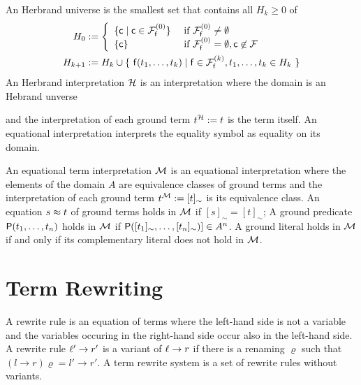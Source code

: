 \begin{definition}\label{def:hk}
	An {\myem Herbrand universe} is the smallest set that contains all $H_k\ge 0$ of
	\begin{align*}
	H_0 &:= \left\{ 
	\begin{array}{ll}
	\{ \mc \mid \mc\in\mcFfn[0] \} 
	&\text{if } \mcFfn[0]\not=\emptyset\\
	\{ \mc \}
	&\text{if } \mcFfn[0]=\emptyset, \mc\not\in\mcF
	\end{array}
	\right. 
	\\
	H_{k+1} &:= H_k \cup \{\  
	\mf(t_1,\ldots,t_k) \mid
	\mf\in\mcFfn[k],
	t_1,\ldots,t_k \in H_k
	\ \}
	\end{align*}
	An {\myem Herbrand interpretation} ${\mathcal H}$ is an interpretation where the domain 
	is an Hebrand unverse
\end{definition}

\begin{definition}
	and the interpretation of each ground term $t^{\mathcal H} := t$ is the term itself.
	An {\myem equational} interpretation interprets the equality symbol as equality on its domain.
\end{definition}

\begin{definition}
	An {\myem equational term interpretation} ${\mathcal M}$ is an equational interpretation 
	where the elements of the domain $A$ 
		are equivalence classes of ground terms
		and the interpretation of each ground term $t^{\mathcal M} := [t]_\sim$ is its equivalence class.
		An equation $s\approx t$ of ground terms holds in ${\mathcal M}$ if $[s]_\sim=[t]_\sim$;
	A ground predicate ${\mathsf P}(t_1,\ldots,t_n)$ holds in ${\mathcal M}$ if ${\mathsf P}([t_1]_\sim,\ldots,[t_n]_\sim)] \in A^n$.
	A ground literal holds in ${\mathcal M}$ if and only if its complementary literal does not hold in ${\mathcal M}$.
	
\end{definition}

\begin{example}
	
\end{example}

\section{Term Rewriting}




\begin{definition}
	A {\myem rewrite rule} is an equation of terms where the left-hand side is not a variable
	and the variables occuring in the right-hand side occur also in the left-hand side.
	A rewrite rule $\ell'\rightarrow r'$ is a {\myem variant} of $\ell\rightarrow r$ if there is a renaming $\varrho$
	such that 
	$(l\rightarrow r)\varrho = l'\rightarrow r'$.
	A {\myem term rewrite system} is a set of rewrite rules without variants.
\end{definition}

